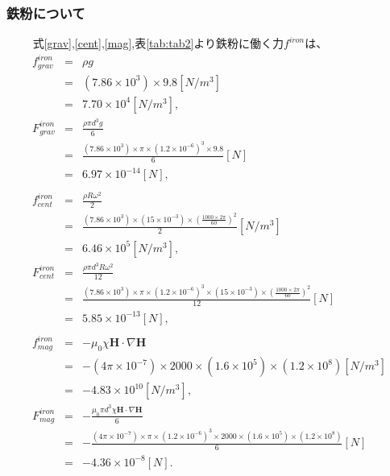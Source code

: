 \documentclass[12pt]{jarticle}
\begin{document}
    \subsubsection{鉄粉について}　
　式\ref{grav},\ref{cent},\ref{mag},表\ref{tab:tab2}より鉄粉に働く力$f^{iron}$は、
      \begin{eqnarray}
        f^{iron}_{grav} & = & \rho g\nonumber \\
                        & = & (7.86\times10^3) \times 9.8 [N/m^3]\nonumber \\ 
                        & = & 7.70 \times 10^4 [N/m^3], \\ 
        F^{iron}_{grav} & = & \frac{ \rho \pi d^3 g }{6} \nonumber \\
                        & = & \frac{ (7.86\times10^3) \times \pi \times (1.2\times10^{-6})^3 \times 9.8 }{6} [N]\nonumber \\ 
                        & = & 6.97 \times 10^{-14} [N], \\ \nonumber \\
        f^{iron}_{cent} & = & \frac{ \rho R \omega^2 }{2}\nonumber \\
                        & = & \frac{ (7.86\times10^3) \times (15\times10^{-3}) \times (\frac{1000\times2\pi}{60})^2 }{2}[N/m^3]\nonumber \\
                        & = & 6.46 \times 10^5 [N/m^3], \\ 
        F^{iron}_{cent} & = & \frac{ \rho \pi d^3 R \omega^2 }{12}\nonumber \\
                        & = & \frac{ (7.86\times10^3) \times \pi \times (1.2\times10^{-6})^3 \times (15\times10^{-3}) \times (\frac{1000\times2\pi}{60})^2 }{12} [N]\nonumber \\
                        & = & 5.85 \times 10^{-13} [N], \\ \nonumber \\
        f^{iron}_{mag} & = & - \mu_0 \chi \bm{H} \cdot \nabla \bm{H} \nonumber \\
                       & = & - (4\pi \times 10^{-7}) \times 2000 \times (1.6\times10^5) \times (1.2\times10^8) [N/m^3] \nonumber \\
                       & = & - 4.83 \times 10^{10} [N/m^3], \\
        F^{iron}_{mag} & = & - \frac{ \mu_0 \pi d^3 \chi \bm{H} \cdot \nabla \bm{H} }{6}  \nonumber \\
                       & = & - \frac{ (4\pi \times 10^{-7}) \times \pi \times (1.2\times10^{-6})^3 \times 2000 \times (1.6\times10^5) \times (1.2\times10^8) }{6} [N] \nonumber \\
                       & = & - 4.36 \times 10^{-8}[N].
      \end{eqnarray}　
\end{document}
